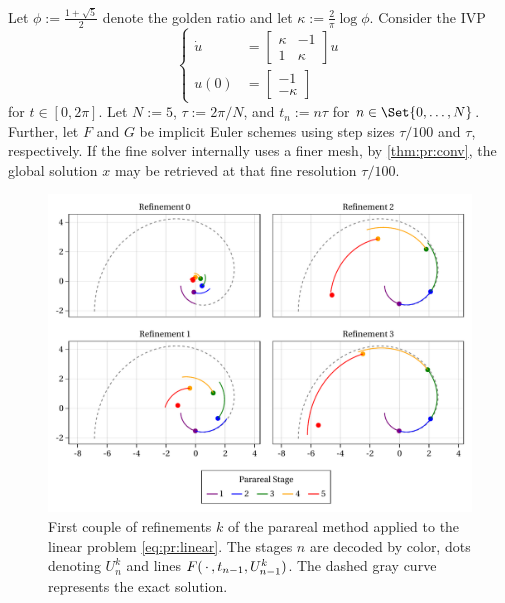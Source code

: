 \begin{example}
\label{example:parareal}
  Let $\phi := \frac{1+\sqrt{5}}{2}$ denote the golden ratio and
  let $\kappa := \frac{2}{\pi} \log \phi$.
  Consider the \ac{IVP}
  \begin{equation}
    \label{eq:pr:linear}
    \left\{
    \begin{aligned}
      \dot u &= \begin{bmatrix}
        \kappa & -1 \\
        1 & \kappa
      \end{bmatrix} u \\
      u(0) &= \begin{bmatrix}
        -1 \\ -\kappa
      \end{bmatrix}
    \end{aligned}
    \right.
  \end{equation}
  for $t\in[0,2\pi]$.
  Let $N := 5$, $\tau := 2\pi/N$, and $t_n := n\tau$ for $n\in\Set{0,\ldots,N}$.
  Further, let $F$ and $G$ be implicit Euler schemes using step sizes $\tau/100$ and $\tau$, respectively.
  If the fine solver internally uses a finer mesh,
  by \autoref{thm:pr:conv},
  the global solution $x$ may be retrieved at that fine resolution $\tau/100$.

  \begin{figure}[tb]
    \includegraphics[width=\textwidth]{figures/fig_parareal_example.pdf}
    \caption[Parareal method applied to a linear ODE]{%
      First couple of refinements $k$ of the
      parareal method applied to the linear problem \eqref{eq:pr:linear}.
      The stages $n$ are decoded by color,
      dots denoting $U^k_n$ and lines $F(\optional{}, t_{n-1}, U^k_{n-1})$.
      The dashed gray curve represents the exact solution.
    }
    \label{fig:pr:linear}
  \end{figure}


\end{example}

